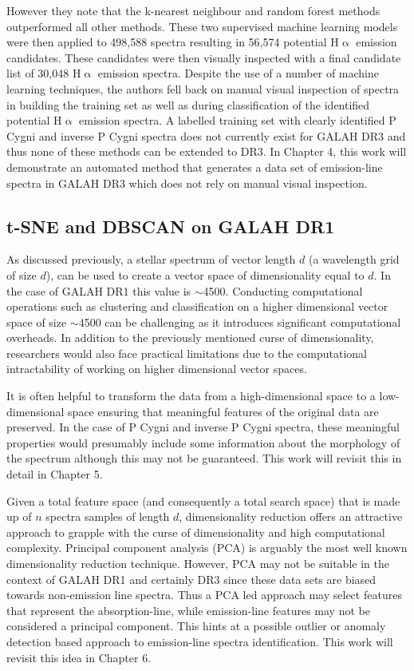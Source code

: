 However they note that the k-nearest neighbour and random forest methods outperformed all other methods. These two supervised machine learning models were then applied to 498,588 spectra resulting in 56,574 potential H$\upalpha$ emission candidates. These candidates were then visually inspected with a final candidate list of 30,048 H$\upalpha$ emission spectra. Despite the use of a number of machine learning techniques, the authors fell back on manual visual inspection of spectra in building the training set as well as during classification of the identified potential H$\upalpha$ emission spectra. A labelled training set with clearly identified P Cygni and inverse P Cygni spectra does not currently exist for GALAH DR3 and thus none of these methods can be extended to DR3. In Chapter 4, this work will demonstrate an automated method that generates a data set of emission-line spectra in GALAH DR3 which does not rely on manual visual inspection.

\subsection{t-SNE and DBSCAN on GALAH DR1}

As discussed previously, a stellar spectrum of vector length $d$ (a wavelength grid of size $d$), can be used to create a vector space of dimensionality equal to $d$. In the case of GALAH DR1 this value is $\sim$4500. Conducting computational operations such as clustering and classification on a higher dimensional vector space of size $\sim$4500 can be challenging as it introduces significant computational overheads. In addition to the previously mentioned curse of dimensionality, researchers would also face practical limitations due to the computational intractability of working on higher dimensional vector spaces. 

It is often helpful to transform the data from a high-dimensional space to a low-dimensional space ensuring that meaningful features of the original data are preserved. In the case of P Cygni and inverse P Cygni spectra, these meaningful properties would presumably include some information about the morphology of the spectrum although this may not be guaranteed. This work will revisit this in detail in Chapter 5.

Given a total feature space (and consequently a total search space) that is made up of $n$ spectra samples of length $d$, dimensionality reduction offers an attractive approach to grapple with the curse of dimensionality and high computational complexity. Principal component analysis (PCA) is arguably the most well known dimensionality reduction technique. However, PCA may not be suitable in the context of GALAH DR1 and certainly DR3 since these data sets are biased towards non-emission line spectra. Thus a PCA led approach may select features that represent the absorption-line, while emission-line features may not be considered a principal component. This hints at a possible outlier or anomaly detection based approach to emission-line spectra identification. This work will revisit this idea in Chapter 6.

